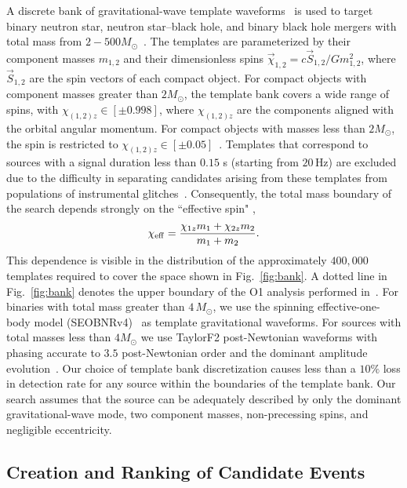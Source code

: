 A discrete bank of gravitational-wave template waveforms~\citep{Owen:1995tm,Owen:1998dk,Brown:2012qf} is used to target binary neutron star,
neutron star--black hole, and binary black hole mergers with total mass from $2-500 M_{\odot}$~\citep{DalCanton:2017ala}. The templates are
parameterized by their component masses $m_{1,2}$ and their dimensionless spins  $\vec{\chi}_{1,2} = c \vec{S}_{1,2}/G m_{1,2}^2$, where
$\vec{S}_{1,2}$ are the spin vectors of each compact object.  For compact objects with component
masses greater than $2 M_{\odot}$, the template bank covers a wide range of spins, with $\chi_{(1,2)z} \in [\pm 0.998]$, where $\chi_{(1,2)z}$ are the components aligned with the orbital angular momentum. For compact objects
with masses less than  $2 M_{\odot}$, the spin is restricted to $\chi_{(1,2)z} \in [\pm 0.05]$~\citep{Brown:2012qf}. Templates that correspond
to sources with a signal duration less than $0.15$ s (starting from $20\,$Hz) are excluded due to the difficulty in separating candidates arising from
these templates from populations of instrumental glitches~\citep{DalCanton:2017ala}. Consequently, the total mass boundary of the search
depends strongly on the ``effective spin" \citep{Racine:2008qv, Ajith:2009bn},
%
\begin{equation}\label{eq:chi_effective}
\chi_{\mathrm{eff}} = \frac{\chi_{1z} m_1 + \chi_{2z} m_2}{m_1+m_2}.
\end{equation}
%
This dependence is visible in the distribution of the approximately $400,000$ templates required to cover the space shown in Fig.~\ref{fig:bank}. A dotted line in Fig.~\ref{fig:bank} denotes the upper boundary of the O1 analysis performed in~\cite{TheLIGOScientific:2016pea}. For binaries with total mass greater than $4\,M_\odot$, we use the spinning effective-one-body model (SEOBNRv4)~\citep{Taracchini:2013,Bohe:2016gbl} as template gravitational waveforms. For sources with total masses less than $4M_{\odot}$ we use TaylorF2 post-Newtonian waveforms with phasing accurate to $3.5$ post-Newtonian order and the dominant amplitude evolution~\citep{Sathyaprakash:1991mt,Droz:1999qx,Blanchet:2002av,Faye:2012we}. Our choice of template bank discretization causes less than a $10\%$ loss in detection rate for any source within the boundaries of the template bank. Our search assumes that the source can be adequately described by only the dominant gravitational-wave mode, two component masses, non-precessing spins, and negligible eccentricity.

\subsection{Creation and Ranking of Candidate Events}

